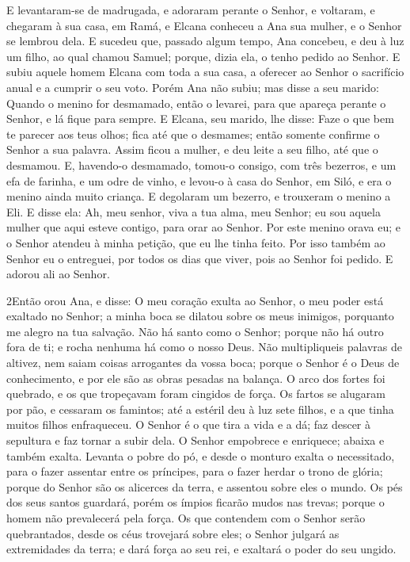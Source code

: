 E levantaram-se de madrugada, e adoraram perante o Senhor, e
voltaram, e chegaram à sua casa, em Ramá, e Elcana conheceu a Ana
sua mulher, e o Senhor se lembrou dela. E sucedeu que,
passado algum tempo, Ana concebeu, e deu à luz um filho, ao qual
chamou Samuel; porque, dizia ela, o tenho pedido ao Senhor. E
subiu aquele homem Elcana com toda a sua casa, a oferecer ao Senhor
o sacrifício anual e a cumprir o seu voto. Porém Ana não
subiu; mas disse a seu marido: Quando o menino for desmamado, então
o levarei, para que apareça perante o Senhor, e lá fique para
sempre. E Elcana, seu marido, lhe disse: Faze o que bem te
parecer aos teus olhos; fica até que o desmames; então somente
confirme o Senhor a sua palavra. Assim ficou a mulher, e deu leite a
seu filho, até que o desmamou. E, havendo-o desmamado,
tomou-o consigo, com três bezerros, e um efa de farinha, e um odre
de vinho, e levou-o à casa do Senhor, em Siló, e era o menino ainda
muito criança. E degolaram um bezerro, e trouxeram o menino a
Eli. E disse ela: Ah, meu senhor, viva a tua alma, meu
Senhor; eu sou aquela mulher que aqui esteve contigo, para orar ao
Senhor. Por este menino orava eu; e o Senhor atendeu à minha
petição, que eu lhe tinha feito. Por isso também ao Senhor eu
o entreguei, por todos os dias que viver, pois ao Senhor foi pedido.
E adorou ali ao Senhor.

\medskip

\lettrine{2} Então orou Ana, e disse: O meu coração exulta ao
Senhor, o meu poder está exaltado no Senhor; a minha boca se dilatou
sobre os meus inimigos, porquanto me alegro na tua salvação. Não
há santo como o Senhor; porque não há outro fora de ti; e rocha
nenhuma há como o nosso Deus. Não multipliqueis palavras de
altivez, nem saiam coisas arrogantes da vossa boca; porque o Senhor
é o Deus de conhecimento, e por ele são as obras pesadas na balança.
O arco dos fortes foi quebrado, e os que tropeçavam foram
cingidos de força. Os fartos se alugaram por pão, e cessaram os
famintos; até a estéril deu à luz sete filhos, e a que tinha muitos
filhos enfraqueceu. O Senhor é o que tira a vida e a dá; faz
descer à sepultura e faz tornar a subir dela. O Senhor empobrece
e enriquece; abaixa e também exalta. Levanta o pobre do pó, e
desde o monturo exalta o necessitado, para o fazer assentar entre os
príncipes, para o fazer herdar o trono de glória; porque do Senhor
são os alicerces da terra, e assentou sobre eles o mundo. Os pés
dos seus santos guardará, porém os ímpios ficarão mudos nas trevas;
porque o homem não prevalecerá pela força. Os que contendem
com o Senhor serão quebrantados, desde os céus trovejará sobre eles;
o Senhor julgará as extremidades da terra; e dará força ao seu rei,
e exaltará o poder do seu ungido.

